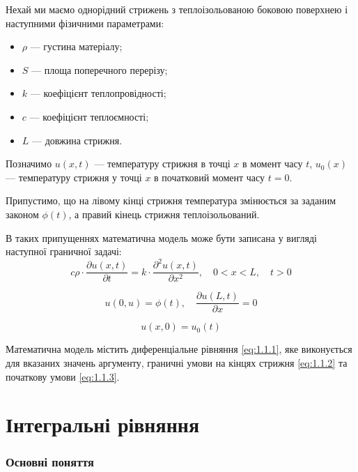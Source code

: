 \begin{example}
	Нехай ми маємо однорідний стрижень з теплоізольованою боковою поверхнею і наступними фізичними параметрами:
	\begin{itemize}
		\item $\rho$ --- густина матеріалу;
		\item $S$ --- площа поперечного перерізу;
		\item $k$ --- коефіцієнт теплопровідності;
		\item $c$ --- коефіцієнт теплоємності;
		\item $L$ --- довжина стрижня.
	\end{itemize}

	Позначимо $u(x, t)$ --- температуру стрижня в точці $x$ в момент часу $t$, $u_0(x)$ --- температуру стрижня у точці $x$ в початковий момент часу $t = 0$. \medskip

	Припустимо, що на лівому кінці стрижня температура змінюється за заданим законом $\phi(t)$, а правий кінець стрижня теплоізольований.
\end{example}

В таких припущеннях математична модель може бути записана у вигляді наступної граничної задачі:
\begin{equation}
	\label{eq:1.1.1}
	c \rho \cdot \dfrac{\partial u(x, t)}{\partial t} = k \cdot \dfrac{\partial^2 u(x, t)}{\partial x^2}, \quad 0 < x < L, \quad t > 0
\end{equation}

\begin{equation}
	\label{eq:1.1.2}
	u(0, u) = \phi(t), \quad  \dfrac{\partial u(L, t)}{\partial x} = 0
\end{equation}

\begin{equation}
	\label{eq:1.1.3}
	u(x, 0) = u_0(t)
\end{equation}

Математична модель містить диференціальне рівняння \eqref{eq:1.1.1}, яке виконується для вказаних значень аргументу, граничні умови на кінцях стрижня \eqref{eq:1.1.2} та початкову умови \eqref{eq:1.1.3}.

\section{Інтегральні рівняння}

\subsubsection{Основні поняття}

